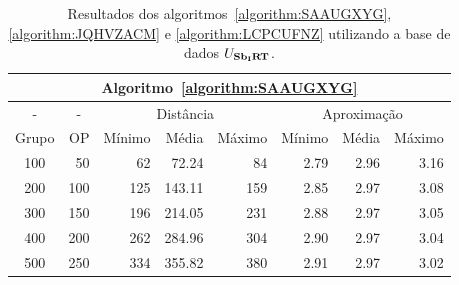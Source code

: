 \begin{table}[!htb]
  \caption{Resultados dos algoritmos~\ref{algorithm:SAAUGXYG}, \ref{algorithm:JQHVZACM} e \ref{algorithm:LCPCUFNZ} utilizando a base de dados $U_{\textbf{Sb\textsubscript{I}RT}}{}$.}
  \label{table:WFTACOYR}
  \centering
  \begin{tabular}{|c|r|r|r|r|r|r|r|}
    \hline
    \multicolumn{8}{|c|}{Algoritmo~\ref{algorithm:SAAUGXYG}}                                                  \\ \hline
      -      & \multicolumn{1}{c|}{-} & \multicolumn{3}{c|}{Distância}             & \multicolumn{3}{c|}{Aproximação}           \\ \hline
    Grupo    & OP                     & Mínimo       & Média        & Máximo       & Mínimo       & Média        & Máximo       \\ \hline  
    100      & 50                     & 62           &  72.24       & 84           & 2.79         & 2.96         & 3.16         \\ \hline
    200      & 100                    & 125          & 143.11       & 159          & 2.85         & 2.97         & 3.08         \\ \hline
    300      & 150                    & 196          & 214.05       & 231          & 2.88         & 2.97         & 3.05         \\ \hline
    400      & 200                    & 262          & 284.96       & 304          & 2.90         & 2.97         & 3.04         \\ \hline
    500      & 250                    & 334          & 355.82       & 380          & 2.91         & 2.97         & 3.02         \\ \hline    
  \end{tabular}

  \vspace{5mm}


\end{table}

